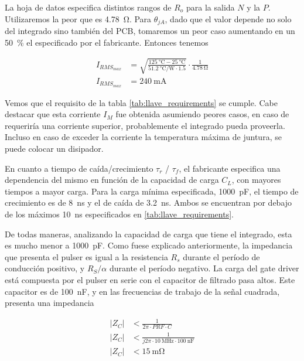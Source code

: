 La hoja de datos especifica distintos rangos de $R_o$ para la salida $N$ y la
$P$. Utilizaremos la peor que es \qty{4.78}{\ohm}. Para $\theta_{jA}$, dado que
el valor depende no solo del integrado sino también del PCB, tomaremos un peor
caso aumentando en un \qty{50}{\percent} el especificado por el fabricante.
Entonces tenemos

\begin{equation}
    \begin{aligned}
        I_{RMS_{max}} &= \sqrt{\frac{ \qty{125}{\celsius}-
        \qty{25}{\celsius}}{\qty[per-mode=fraction]{51.2}{\celsius\per\watt}
        \cdot 1.5 }} \cdot \frac{1}{ \qty{4.78}{\ohm} } \\
        I_{RMS_{max}} &= \qty{240}{\milli\ampere}
    \end{aligned}
\end{equation}

Vemos que el requisito de la tabla \ref{tab:llave_requirements} se cumple. Cabe
destacar que esta corriente $I_M$ fue obtenida asumiendo peores casos, en caso
de requeriría una corriente superior, probablemente el integrado pueda
proveerla. Incluso en caso de exceder la corriente la temperatura máxima de
juntura, se puede colocar un disipador.

En cuanto a tiempo de caída/crecimiento $\tau_{r}$ / $\tau_{f}$, el fabricante
especifica una dependencia del mismo en función de la capacidad de carga $C_L$,
con mayores tiempos a mayor carga. Para la carga mínima especificada,
\qty{1000}{\pico\farad}, el tiempo de crecimiento es de \qty{8}{\nano\second} y
el de caída de \qty{3.2}{\nano\second}. Ambos se encuentran por debajo de los
máximos \qty{10}{\nano\second} especificados en \ref{tab:llave_requirements}.

De todas maneras, analizando la capacidad de carga que tiene el integrado, esta
es mucho menor a \qty{1000}{\pico\farad}. Como fuese explicado anteriormente, la
impedancia que presenta el pulser es igual a la resistencia $R_s$ durante el
período de conducción positivo, y $R_S/\alpha$ durante el período negativo. La
carga del gate driver está compuesta por el pulser en serie con el capacitor de
filtrado pasa altos. Este capacitor es de \qty{100}{\nano\farad}, y en las
frecuencias de trabajo de la señal cuadrada, presenta una impedancia

\begin{equation}
    \begin{aligned}
        | Z_C | &< \frac{1}{2\pi \cdot PRF \cdot C} \\
        | Z_C | &< \frac{1}{j2\pi \cdot \qty{10}{\mega\hertz} \cdot
        \qty{100}{\nano\farad}} \\
        | Z_C | &< \qty{15}{\milli\ohm}
    \end{aligned}
\end{equation}

